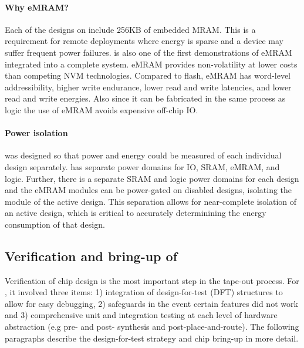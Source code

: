 \paragraph{Why eMRAM?}
Each of the designs on \msilicon include 256KB of embedded MRAM.
% 
This is a requirement for remote deployments where energy is sparse and a device may suffer frequent power failures.
% 
\msilicon is also one of the first demonstrations of eMRAM integrated into a complete system.
% 
eMRAM provides non-volatility at lower costs than competing NVM technologies.
% 
Compared to flash, eMRAM has word-level addressibility, higher write endurance, lower read and write latencies, and lower read and write energies.
% 
Also since it can be fabricated in the same process as logic the use of eMRAM avoids expensive off-chip IO.

\paragraph{Power isolation}
\msilicon was designed so that power and energy could be measured of each individual design separately.
% 
\msilicon has separate power domains for IO, SRAM, eMRAM, and logic.
% 
Further, there is a separate SRAM and logic power domains for each design and the eMRAM modules can be power-gated on disabled designs, isolating the module of the active design.
% 
This separation allows for near-complete isolation of an active design, which is critical to accurately determinining the energy consumption of that design.

\subsection{Verification and bring-up of \msilicon}
Verification of chip design is the most important step in the tape-out process.
% 
% 
For \msilicon, it involved three items: 1) integration of design-for-test (DFT) structures to allow for easy debugging, 2) safeguards in the event certain features did not work and 3) comprehensive unit and integration testing at each level of hardware abstraction (e.g pre- and post- synthesis and post-place-and-route).
% 
The following paragraphs describe the design-for-test strategy and chip bring-up in more detail.

